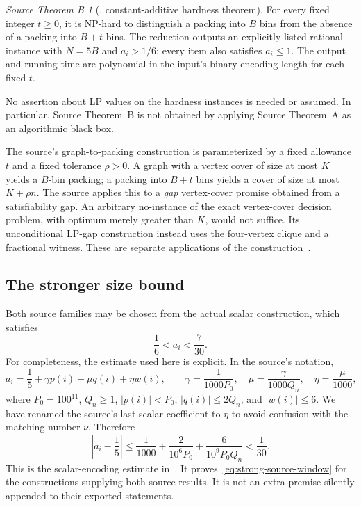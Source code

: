 \documentclass[11pt,a4paper]{article}
\theoremstyle{definition}
\theoremstyle{remark}
\newtheorem*{sourcehard}{Source Theorem B}
\begin{document}
\begin{sourcehard}[\cite{OAI26}, constant-additive hardness theorem]
For every fixed integer $t\ge0$, it is NP-hard to distinguish a packing into $B$ bins from the absence of a packing into $B+t$ bins. The reduction outputs an explicitly listed rational instance with $N=5B$ and $a_i>1/6$; every item also satisfies $a_i\le1$. The output and running time are polynomial in the input's binary encoding length for each fixed $t$.
\end{sourcehard}
No assertion about LP values on the hardness instances is needed or assumed. In particular, Source Theorem~B is not obtained by applying Source Theorem~A as an algorithmic black box.

The source's graph-to-packing construction is parameterized by a fixed allowance $t$ and a fixed tolerance $\rho>0$. A graph with a vertex cover of size at most $K$ yields a $B$-bin packing; a packing into $B+t$ bins yields a cover of size at most $K+\rho n$. The source applies this to a \emph{gap} vertex-cover promise obtained from a satisfiability gap. An arbitrary no-instance of the exact vertex-cover decision problem, with optimum merely greater than $K$, would not suffice. Its unconditional LP-gap construction instead uses the four-vertex clique and a fractional witness. These are separate applications of the construction~\cite[Sections~5--7]{OAI26}.

\subsection{The stronger size bound}
Both source families may be chosen from the actual scalar construction, which satisfies
\begin{equation}\label{eq:strong-source-window}
 \frac16<a_i<\frac7{30}.
\end{equation}
For completeness, the estimate used here is explicit. In the source's notation,
\[
 a_i=\frac15+\gamma p(i)+\mu q(i)+\eta w(i),
 \qquad
 \gamma=\frac1{1000P_0},\quad
 \mu=\frac{\gamma}{1000Q_n},\quad
 \eta=\frac{\mu}{1000},
\]
where $P_0=100^{11}$, $Q_n\ge1$, $|p(i)|<P_0$, $|q(i)|\le2Q_n$, and $|w(i)|\le6$. We have renamed the source's last scalar coefficient to $\eta$ to avoid confusion with the matching number $\nu$. Therefore
\begin{equation}\label{eq:source-estimate}
 \left|a_i-\frac15\right|
 \le\frac1{1000}+\frac{2}{10^6P_0}
       +\frac{6}{10^9P_0Q_n}
 <\frac1{30}.
\end{equation}
This is the scalar-encoding estimate in~\cite[Section~3]{OAI26}. It proves~\eqref{eq:strong-source-window} for the constructions supplying both source results. It is not an extra premise silently appended to their exported statements.
\end{document}
